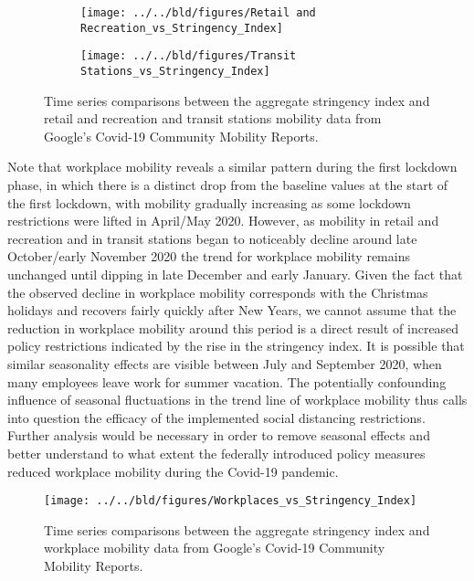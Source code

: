 \begin{figure}[H]
     \centering
     \begin{subfigure}[b]{\textwidth}
         \centering
         \texttt{[image: ../../bld/figures/Retail and Recreation\_vs\_Stringency\_Index]}
         \caption{}
         \label{fig:retail and rec}
     \end{subfigure}
     \hfill
     \begin{subfigure}[b]{\textwidth}
         \centering
         \texttt{[image: ../../bld/figures/Transit Stations\_vs\_Stringency\_Index]}
         \caption{}
         \label{fig:transit}
     \end{subfigure}
        \caption{Time series comparisons between the aggregate stringency index and retail and recreation and transit stations mobility data from Google's Covid-19 Community Mobility Reports.}
         \label{fig:retailandtransit}
\end{figure}

Note that workplace mobility reveals a similar pattern during the first lockdown phase, in which there is a distinct drop from the baseline values at the start of the first lockdown, with mobility gradually increasing as some lockdown restrictions were lifted in April/May 2020. However, as mobility in retail and recreation and in transit stations began to noticeably decline around late October/early November 2020 the trend for workplace mobility remains unchanged until dipping in late December and early January. Given the fact that the observed decline in workplace mobility corresponds with the Christmas holidays and recovers fairly quickly after New Years, we cannot assume that the reduction in workplace mobility around this period is a direct result of increased policy restrictions indicated by the rise in the stringency index. It is possible that similar seasonality effects are visible between July and September 2020, when many employees leave work for summer vacation. The potentially confounding influence of seasonal fluctuations in the trend line of workplace mobility thus calls into question the efficacy of the implemented social distancing restrictions. Further analysis would be necessary in order to remove seasonal effects and better understand to what extent the federally introduced policy measures reduced workplace mobility during the Covid-19 pandemic.

\begin{figure}[H]
      \centering
      \texttt{[image: ../../bld/figures/Workplaces\_vs\_Stringency\_Index]}
      \label{fig:five over x}
      \caption{Time series comparisons between the aggregate stringency index and workplace mobility data from Google's Covid-19 Community Mobility Reports.}
      \label{fig:workplace}
\end{figure}

